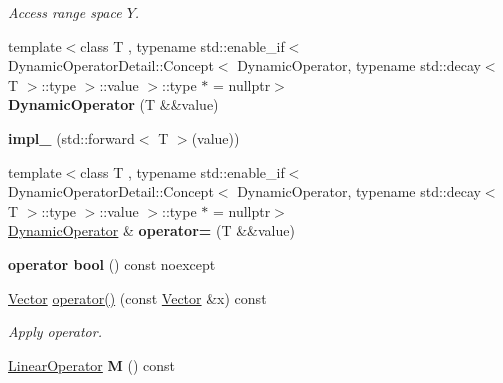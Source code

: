 \begin{DoxyCompactItemize}
\begin{DoxyCompactList}\small\item\em Access range space $Y$. \end{DoxyCompactList}\item 
\hypertarget{classSpacy_1_1DynamicOperator_a5cc35e7a7c5a9711f465a11c81fdd29a}{{\footnotesize template$<$class T , typename std\-::enable\-\_\-if$<$ Dynamic\-Operator\-Detail\-::\-Concept$<$ Dynamic\-Operator, typename std\-::decay$<$ T $>$\-::type $>$\-::value $>$\-::type $\ast$  = nullptr$>$ }\\{\bfseries Dynamic\-Operator} (T \&\&value)}\label{classSpacy_1_1DynamicOperator_a5cc35e7a7c5a9711f465a11c81fdd29a}

\item 
\hypertarget{classSpacy_1_1DynamicOperator_a7d31898db1d94c20b9c93dfc88c5cecd}{{\bfseries impl\-\_\-} (std\-::forward$<$ T $>$(value))}\label{classSpacy_1_1DynamicOperator_a7d31898db1d94c20b9c93dfc88c5cecd}

\item 
\hypertarget{classSpacy_1_1DynamicOperator_af03a1b856d668cbd78eaf9df83487a55}{{\footnotesize template$<$class T , typename std\-::enable\-\_\-if$<$ Dynamic\-Operator\-Detail\-::\-Concept$<$ Dynamic\-Operator, typename std\-::decay$<$ T $>$\-::type $>$\-::value $>$\-::type $\ast$  = nullptr$>$ }\\\hyperlink{classSpacy_1_1DynamicOperator}{Dynamic\-Operator} \& {\bfseries operator=} (T \&\&value)}\label{classSpacy_1_1DynamicOperator_af03a1b856d668cbd78eaf9df83487a55}

\item 
\hypertarget{classSpacy_1_1DynamicOperator_a4d7243f9e135e01d4f87a0e21fe7cbe1}{{\bfseries operator bool} () const noexcept}\label{classSpacy_1_1DynamicOperator_a4d7243f9e135e01d4f87a0e21fe7cbe1}

\item 
\hypertarget{classSpacy_1_1DynamicOperator_ace2c2202ca6eb3fe5f5817087d30510a}{\hyperlink{classSpacy_1_1Vector}{Vector} \hyperlink{classSpacy_1_1DynamicOperator_ace2c2202ca6eb3fe5f5817087d30510a}{operator()} (const \hyperlink{classSpacy_1_1Vector}{Vector} \&x) const }\label{classSpacy_1_1DynamicOperator_ace2c2202ca6eb3fe5f5817087d30510a}

\begin{DoxyCompactList}\small\item\em Apply operator. \end{DoxyCompactList}\item 
\hypertarget{classSpacy_1_1DynamicOperator_a38c8c5337fd79a98a7e64139d0cbed38}{\hyperlink{classSpacy_1_1LinearOperator}{Linear\-Operator} {\bfseries M} () const }\label{classSpacy_1_1DynamicOperator_a38c8c5337fd79a98a7e64139d0cbed38}


\end{DoxyCompactItemize}
